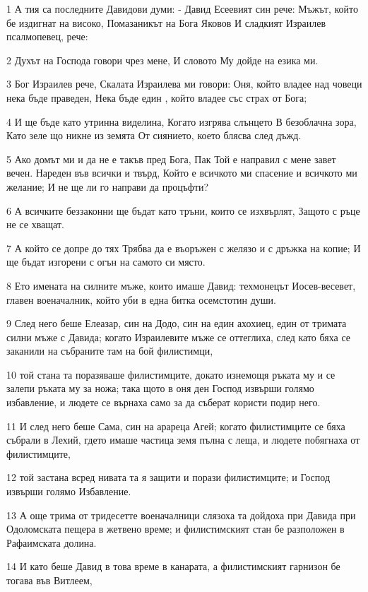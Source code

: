 \par 1 А тия са последните Давидови думи: - Давид Есеевият син рече: Мъжът, който бе издигнат на високо, Помазаникът на Бога Яковов И сладкият Израилев псалмопевец, рече:
\par 2 Духът на Господа говори чрез мене, И словото Му дойде на езика ми.
\par 3 Бог Израилев рече, Скалата Израилева ми говори: Оня, който владее над човеци нека бъде праведен, Нека бъде един , който владее със страх от Бога;
\par 4 И ще бъде като утринна виделина, Когато изгрява слънцето В безоблачна зора, Като зеле що никне из земята От сиянието, което блясва след дъжд.
\par 5 Ако домът ми и да не е такъв пред Бога, Пак Той е направил с мене завет вечен. Нареден във всички и твърд, Който е всичкото ми спасение и всичкото ми желание; И не ще ли го направи да процъфти?
\par 6 А всичките беззаконни ще бъдат като тръни, които се изхвърлят, Защото с ръце не се хващат.
\par 7 А който се допре до тях Трябва да е въоръжен с желязо и с дръжка на копие; И ще бъдат изгорени с огън на самото си място.
\par 8 Ето имената на силните мъже, които имаше Давид: техмонецът Иосев-весевет, главен военачалник, който уби в една битка осемстотин души.
\par 9 След него беше Елеазар, син на Додо, син на един ахохиец, един от тримата силни мъже с Давида; когато Израилевите мъже се оттеглиха, след като бяха се заканили на събраните там на бой филистимци,
\par 10 той стана та поразяваше филистимците, докато изнемощя ръката му и се залепи ръката му за ножа; така щото в оня ден Господ извърши голямо избавление, и людете се върнаха само за да съберат користи подир него.
\par 11 И след него беше Сама, син на арареца Агей; когато филистимците се бяха събрали в Лехий, гдето имаше частица земя пълна с леща, и людете побягнаха от филистимците,
\par 12 той застана всред нивата та я защити и порази филистимците; и Господ извърши голямо Избавление.
\par 13 А още трима от тридесетте военачалници слязоха та дойдоха при Давида при Одоломската пещера в жетвено време; и филистимският стан бе разположен в Рафаимската долина.
\par 14 И като беше Давид в това време в канарата, а филистимският гарнизон бе тогава във Витлеем,
